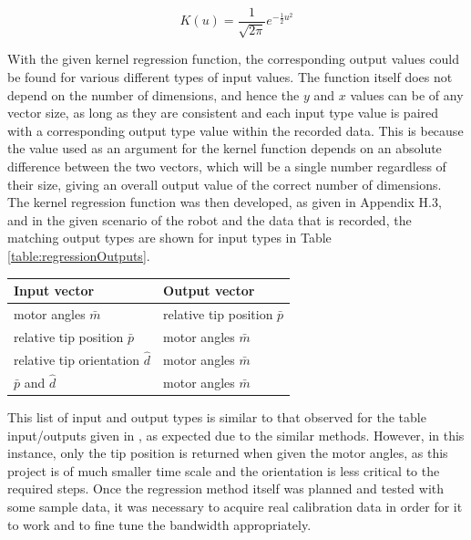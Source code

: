 \documentclass[11pt]{article}
\begin{document}
\begin{equation}\label{equation:Gaussian}
K(u) = \frac{1}{\sqrt{2\pi}}e^{-\frac{1}{2}u^2}
\end{equation}

With the given kernel regression function, the corresponding output values could be found for various different types of input values. The function itself does not depend on the number of dimensions, and hence the $y$ and $x$ values can be of any vector size, as long as they are consistent and each input type value is paired with a corresponding output type value within the recorded data. This is because the value used as an argument for the kernel function depends on an absolute difference between the two vectors, which will be a single number regardless of their size, giving an overall output value of the correct number of dimensions. The kernel regression function was then developed, as given in Appendix H.3, and in the given scenario of the robot and the data that is recorded, the matching output types are shown for input types in Table \ref{table:regressionOutputs}.

\begin{center}
\label{table:regressionOutputs}
\begin{tabularx}{0.66\textwidth}{ | >{\centering\arraybackslash}p{12em} |>{\centering\arraybackslash}X|} 
\hline
Input vector & Output vector\\
\hline
motor angles $\bar{m}$ & relative tip position $\bar{p}$ \\
relative tip position $\bar{p}$ & motor angles $\bar{m}$ \\
relative tip orientation $\hat{d}$ & motor angles $\bar{m}$ \\
$\bar{p}$ and $\hat{d}$ & motor angles $\bar{m}$\\
\hline
\end{tabularx}
\end{center}

This list of input and output types is similar to that observed for the table input/outputs given in \cite{GreggSmithDesign}, as expected due to the similar methods. However, in this instance, only the tip position is returned when given the motor angles, as this project is of much smaller time scale and the orientation is less critical to the required steps. Once the regression method itself was planned and tested with some sample data, it was necessary to acquire real calibration data in order for it to work and to fine tune the bandwidth appropriately.
\end{document}
